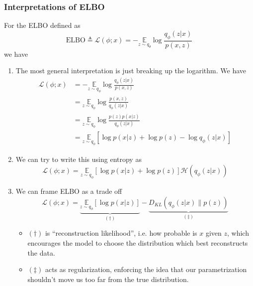 \documentclass[11pt]{article}
\begin{document}
\subsubsection{Interpretations of ELBO}
For the ELBO defined as
\begin{equation}
    \mathrm{ELBO} \triangleq \mathcal{L}(\phi ; x) =-\underset{z \sim q_{\theta}}{\mathbb{E}} \log \frac{q_{\phi}(z | x)}{p(x, z)}
\end{equation}
we have
\begin{enumerate}
    \item The most general interpretation is just breaking up the logarithm. We have
    \begin{align}
        \mathcal{L}(\phi ; x)
        &=-\underset{z \sim q_{\phi}}{\mathbb{E}} \log \frac{q_{\phi}(z | x)}{p(x, z)} \\
        &= \underset{z \sim q_{\phi}}{\mathbb{E}} \log \frac{p(x, z)}{q_{\phi}(z | x)} \\
        &= \underset{z \sim q_{\phi}}{\mathbb{E}} \log \frac{p(z) p(x | z)}{q_{\phi}(z | x)} \\
        &= \underset{z \sim q_{\phi}}{\mathbb{E}}\left[\log p(x | z)+\log p(z)-\log q_{\phi}(z | x)\right]
    \end{align}
    \item We can try to write this using entropy as 
    \begin{equation}
        \mathcal{L}(\phi ; x) = \underset{z \sim q_{\phi}}{\mathbb{E}}[\log p(x | z)+\log p(z)] \mathcal{H}\left(q_{\phi}(z | x)\right)
    \end{equation}
    \item We can frame ELBO as a trade off
    \begin{equation}
        \mathcal{L}(\phi ; x) = \underbrace{\underset{z \sim q_{\phi}}{\mathbb{E}}[\log p(x | z)]}_{(\dag)} - \underbrace{D_{K L}\left(q_{\phi}(z | x) \| p(z)\right)}_{(\ddag)}
    \end{equation}
    \begin{itemize}
        \item $(\dag)$ is ``reconstruction likelihood'', i.e. how probable is $x$ given $z$, which encourages the model to choose the distribution which best reconstructs the data. 
        \item $(\ddag)$ acts as regularization, enforcing the idea that our parametrization shouldn't move us too far from the true distribution. 
    \end{itemize}
\end{enumerate}
\end{document}
